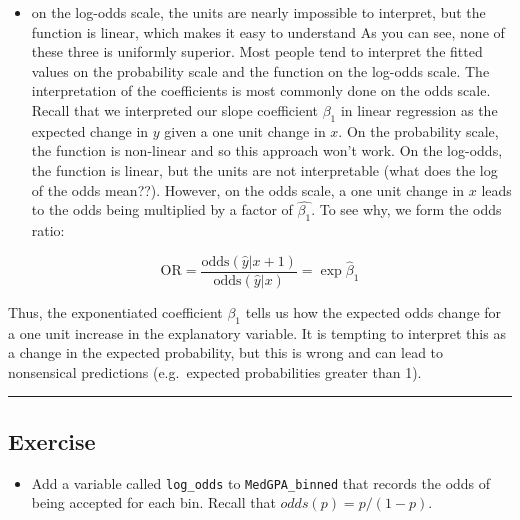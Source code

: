 \documentclass[
]{book}
\newenvironment{Shaded}{\begin{snugshade}}{\end{snugshade}}
\newcommand{\CommentTok}[1]{\textcolor[rgb]{0.56,0.35,0.01}{\textit{#1}}}
\newcommand{\DataTypeTok}[1]{\textcolor[rgb]{0.13,0.29,0.53}{#1}}
\newcommand{\DecValTok}[1]{\textcolor[rgb]{0.00,0.00,0.81}{#1}}
\newcommand{\KeywordTok}[1]{\textcolor[rgb]{0.13,0.29,0.53}{\textbf{#1}}}
\newcommand{\NormalTok}[1]{#1}
\newcommand{\OperatorTok}[1]{\textcolor[rgb]{0.81,0.36,0.00}{\textbf{#1}}}
\newcommand{\StringTok}[1]{\textcolor[rgb]{0.31,0.60,0.02}{#1}}
\providecommand{\tightlist}{%
  \setlength{\itemsep}{0pt}\setlength{\parskip}{0pt}}
\begin{document}
\begin{itemize}
\tightlist
\item
  on the log-odds scale, the units are nearly impossible to interpret, but the function is linear, which makes it easy to understand
  As you can see, none of these three is uniformly superior. Most people tend to interpret the fitted values on the probability scale and the function on the log-odds scale. The interpretation of the coefficients is most commonly done on the odds scale. Recall that we interpreted our slope coefficient \(\beta_1\) in linear regression as the expected change in \(y\) given a one unit change in \(x\). On the probability scale, the function is non-linear and so this approach won't work. On the log-odds, the function is linear, but the units are not interpretable (what does the log of the odds mean??). However, on the odds scale, a one unit change in \(x\) leads to the odds being multiplied by a factor of \(\hat{\beta_1}\). To see why, we form the odds ratio:
\end{itemize}

\begin{equation}
\text{OR}=\frac{\text{odds}(\hat{y}|x + 1)}{\text{odds}(\hat{y}|x)} = \exp \hat{\beta}_1
\end{equation}

Thus, the exponentiated coefficient \(\beta_1\) tells us how the expected odds change for a one unit increase in the explanatory variable. It is tempting to interpret this as a change in the expected probability, but this is wrong and can lead to nonsensical predictions (e.g.~expected probabilities greater than 1).

\begin{center}\rule{0.5\linewidth}{0.5pt}\end{center}

\hypertarget{exercise-18}{%
\subsection*{Exercise}\label{exercise-18}}

\begin{itemize}
\tightlist
\item
  Add a variable called \texttt{log\_odds} to \texttt{MedGPA\_binned} that records the odds of being accepted for each bin. Recall that \(odds(p) = p/(1-p)\).
\end{itemize}

\begin{Shaded}
\end{Shaded}
\end{document}
